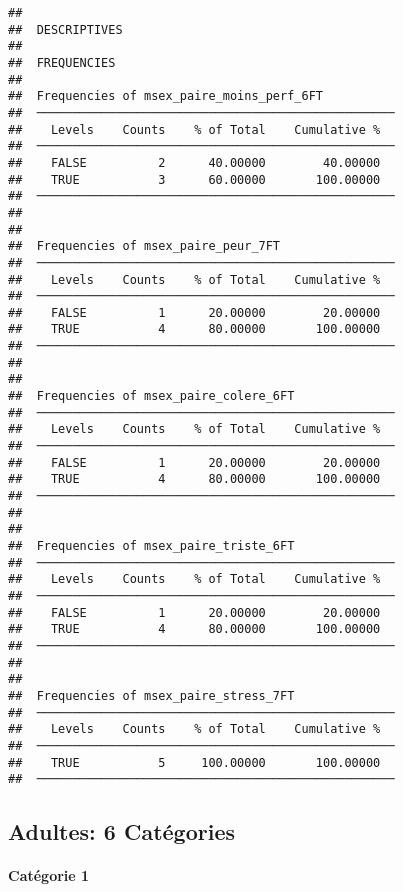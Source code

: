 \documentclass[
]{article}
\begin{document}
\begin{verbatim}
## 
##  DESCRIPTIVES
## 
##  FREQUENCIES
## 
##  Frequencies of msex_paire_moins_perf_6FT           
##  ────────────────────────────────────────────────── 
##    Levels    Counts    % of Total    Cumulative %   
##  ────────────────────────────────────────────────── 
##    FALSE          2      40.00000        40.00000   
##    TRUE           3      60.00000       100.00000   
##  ────────────────────────────────────────────────── 
## 
## 
##  Frequencies of msex_paire_peur_7FT                 
##  ────────────────────────────────────────────────── 
##    Levels    Counts    % of Total    Cumulative %   
##  ────────────────────────────────────────────────── 
##    FALSE          1      20.00000        20.00000   
##    TRUE           4      80.00000       100.00000   
##  ────────────────────────────────────────────────── 
## 
## 
##  Frequencies of msex_paire_colere_6FT               
##  ────────────────────────────────────────────────── 
##    Levels    Counts    % of Total    Cumulative %   
##  ────────────────────────────────────────────────── 
##    FALSE          1      20.00000        20.00000   
##    TRUE           4      80.00000       100.00000   
##  ────────────────────────────────────────────────── 
## 
## 
##  Frequencies of msex_paire_triste_6FT               
##  ────────────────────────────────────────────────── 
##    Levels    Counts    % of Total    Cumulative %   
##  ────────────────────────────────────────────────── 
##    FALSE          1      20.00000        20.00000   
##    TRUE           4      80.00000       100.00000   
##  ────────────────────────────────────────────────── 
## 
## 
##  Frequencies of msex_paire_stress_7FT               
##  ────────────────────────────────────────────────── 
##    Levels    Counts    % of Total    Cumulative %   
##  ────────────────────────────────────────────────── 
##    TRUE           5     100.00000       100.00000   
##  ──────────────────────────────────────────────────
\end{verbatim}

\hypertarget{adultes-6-catuxe9gories}{%
\subsection{Adultes: 6 Catégories}\label{adultes-6-catuxe9gories}}

\hypertarget{catuxe9gorie-1-3}{%
\paragraph{Catégorie 1}\label{catuxe9gorie-1-3}}
\end{document}
